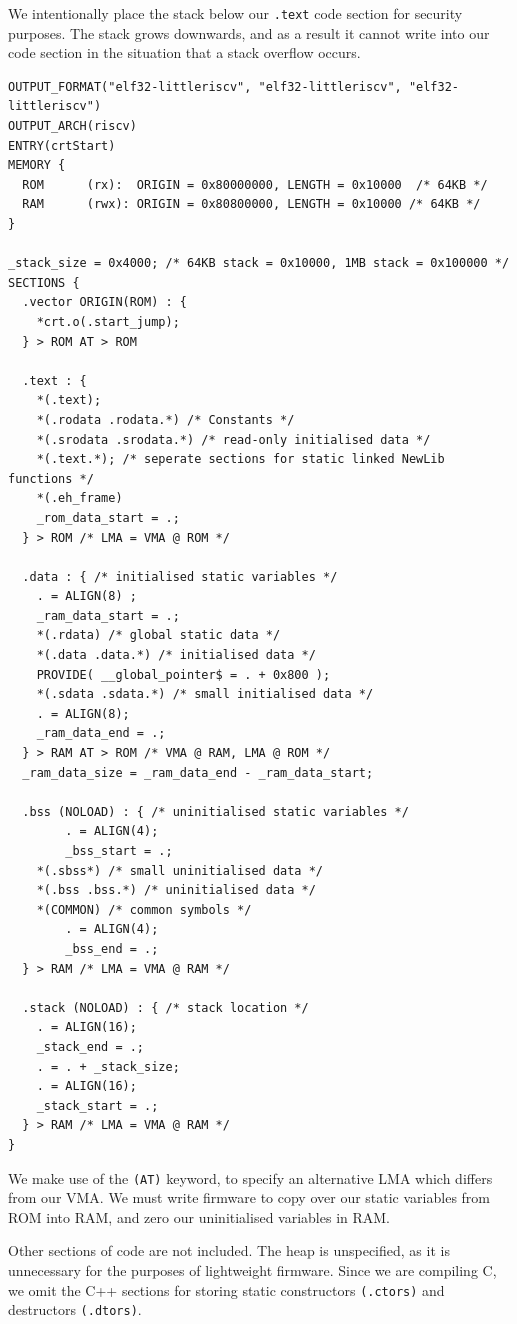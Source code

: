 \documentclass[a4paper,8pt]{report}
\begin{document}
We intentionally place the stack below our \texttt{.text} code section for security
purposes. The stack grows downwards, and as a result it cannot write into our
code section in the situation that a stack overflow occurs.

\scriptsize
\begin{verbatim}
OUTPUT_FORMAT("elf32-littleriscv", "elf32-littleriscv", "elf32-littleriscv")
OUTPUT_ARCH(riscv)
ENTRY(crtStart)
MEMORY {
  ROM      (rx):  ORIGIN = 0x80000000, LENGTH = 0x10000  /* 64KB */
  RAM      (rwx): ORIGIN = 0x80800000, LENGTH = 0x10000 /* 64KB */
}

_stack_size = 0x4000; /* 64KB stack = 0x10000, 1MB stack = 0x100000 */
SECTIONS {
  .vector ORIGIN(ROM) : {
    *crt.o(.start_jump);
  } > ROM AT > ROM

  .text : {
    *(.text);
    *(.rodata .rodata.*) /* Constants */
    *(.srodata .srodata.*) /* read-only initialised data */
    *(.text.*); /* seperate sections for static linked NewLib functions */
    *(.eh_frame)
    _rom_data_start = .;
  } > ROM /* LMA = VMA @ ROM */
  
  .data : { /* initialised static variables */
    . = ALIGN(8) ;
    _ram_data_start = .;
    *(.rdata) /* global static data */
    *(.data .data.*) /* initialised data */
    PROVIDE( __global_pointer$ = . + 0x800 );
    *(.sdata .sdata.*) /* small initialised data */
    . = ALIGN(8);
    _ram_data_end = .;
  } > RAM AT > ROM /* VMA @ RAM, LMA @ ROM */
  _ram_data_size = _ram_data_end - _ram_data_start;

  .bss (NOLOAD) : { /* uninitialised static variables */
		. = ALIGN(4);
		_bss_start = .;
    *(.sbss*) /* small uninitialised data */
    *(.bss .bss.*) /* uninitialised data */
    *(COMMON) /* common symbols */
		. = ALIGN(4);
		_bss_end = .;
  } > RAM /* LMA = VMA @ RAM */

  .stack (NOLOAD) : { /* stack location */
    . = ALIGN(16);
    _stack_end = .;
    . = . + _stack_size;
    . = ALIGN(16);
    _stack_start = .;
  } > RAM /* LMA = VMA @ RAM */
}
\end{verbatim}
\normalsize

We make use of the \texttt{(AT)} keyword, to specify an alternative LMA which
differs from our VMA. We must write firmware to copy over our static variables
from ROM into RAM, and zero our uninitialised variables in RAM.

Other sections of code are not included. The heap is unspecified, as it is
unnecessary for the purposes of lightweight firmware. Since we are compiling C,
we omit the C++ sections for storing static constructors \texttt{(.ctors)} and
destructors \texttt{(.dtors)}.
\end{document}
